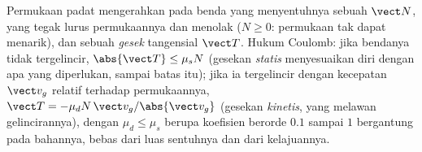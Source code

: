 \begin{proposition}\label{prop:b1:newton-dynamics:friction}
Permukaan padat mengerahkan pada benda yang menyentuhnya sebuah
\emph{} $\vect N$, yang tegak lurus permukaannya dan
menolak ($N \geq 0$: permukaan tak dapat menarik), dan sebuah \emph{
gesek} tangensial $\vect T$. Hukum Coulomb: jika bendanya tidak
tergelincir, $\abs{\vect T} \leq \mu_s N$ (gesekan \emph{statis}
menyesuaikan diri dengan apa yang diperlukan, sampai batas itu); jika ia
tergelincir dengan kecepatan $\vect v_g$ relatif terhadap permukaannya,
$\vect T = -\mu_d N\,\vect v_g/\abs{\vect v_g}$ (gesekan \emph{kinetis},
yang melawan gelincirannya), dengan $\mu_d \leq \mu_s$ berupa koefisien
berorde $0.1$ sampai $1$ bergantung pada bahannya, bebas dari luas
sentuhnya dan dari kelajuannya.
\end{proposition}
\admitted

